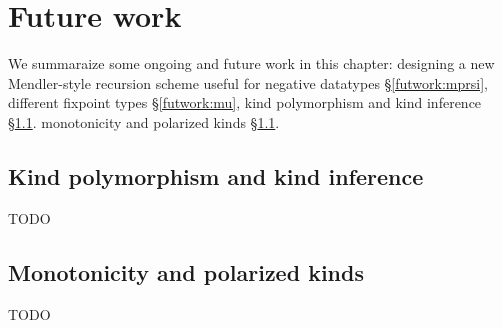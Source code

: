 \chapter{Future work}\label{ch:futwork}
We summaraize some ongoing and future work in this chapter:
designing a new Mendler-style recursion scheme
useful for negative datatypes \S\ref{futwork:mprsi},
different fixpoint types \S\ref{futwork:mu},
kind polymorphism and kind inference \S\ref{sec:futwork:kindpoly}.
monotonicity and polarized kinds \S\ref{sec:futwork:kindpoly}.



\section{Kind polymorphism and kind inference}\label{sec:futwork:kindpoly}
TODO

\section{Monotonicity and polarized kinds}\label{sec:futwork:mon}
TODO
